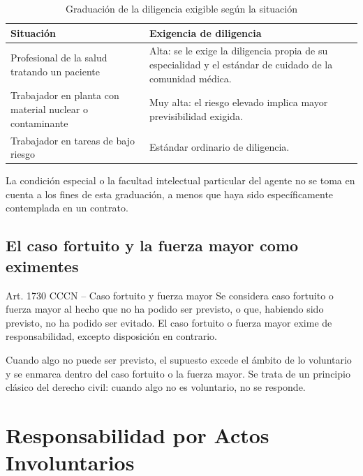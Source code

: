 \documentclass[12pt,oneside]{book}
\begin{document}
\begin{table}[H]
\centering
\caption{Graduación de la diligencia exigible según la situación}
\begin{tabularx}{\textwidth}{X X}
\toprule
\textbf{Situación} & \textbf{Exigencia de diligencia} \\
\midrule
Profesional de la salud tratando un paciente & Alta: se le exige la diligencia propia de su especialidad y el estándar de cuidado de la comunidad médica. \\
Trabajador en planta con material nuclear o contaminante & Muy alta: el riesgo elevado implica mayor previsibilidad exigida. \\
Trabajador en tareas de bajo riesgo & Estándar ordinario de diligencia. \\
\bottomrule
\end{tabularx}
\end{table}

La condición especial o la facultad intelectual particular del agente no se toma en cuenta a los fines de esta graduación, a menos que haya sido específicamente contemplada en un contrato.

\section{El caso fortuito y la fuerza mayor como eximentes}

\begin{definition}{Art. 1730 CCCN -- Caso fortuito y fuerza mayor}
Se considera caso fortuito o fuerza mayor al hecho que no ha podido ser previsto, o que, habiendo sido previsto, no ha podido ser evitado. El caso fortuito o fuerza mayor exime de responsabilidad, excepto disposición en contrario.
\end{definition}

\begin{important}
Cuando algo no puede ser previsto, el supuesto excede el ámbito de lo voluntario y se enmarca dentro del caso fortuito o la fuerza mayor. Se trata de un principio clásico del derecho civil: cuando algo no es voluntario, no se responde.
\end{important}

\chapter{Responsabilidad por Actos Involuntarios}
\end{document}

